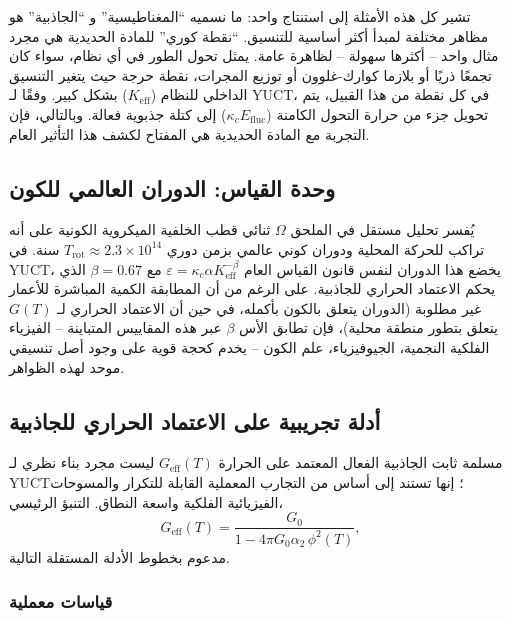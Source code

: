\documentclass[11pt,a4paper]{article}
\begin{document}
	تشير كل هذه الأمثلة إلى استنتاج واحد: ما نسميه ``المغناطيسية'' و ``الجاذبية'' هو مظاهر مختلفة لمبدأ أكثر أساسية للتنسيق. ``نقطة كوري'' للمادة الحديدية هي مجرد مثال واحد – أكثرها سهولة – لظاهرة عامة. يمثل تحول الطور في أي نظام، سواء كان تجمعًا ذريًا أو بلازما كوارك-غلوون أو توزيع المجرات، نقطة حرجة حيث يتغير التنسيق الداخلي للنظام ($K_{\mathrm{eff}}$) بشكل كبير. وفقًا لـ YUCT، في كل نقطة من هذا القبيل، يتم تحويل جزء من حرارة التحول الكامنة ($\kappa_c E_{\mathrm{fluc}}$) إلى كتلة جذبوية فعالة. وبالتالي، فإن التجربة مع المادة الحديدية هي المفتاح لكشف هذا التأثير العام.
	
	\subsection{وحدة القياس: الدوران العالمي للكون}
	
	يُفسر تحليل مستقل في الملحق $\Omega$ ثنائي قطب الخلفية الميكروية الكونية على أنه تراكب للحركة المحلية ودوران كوني عالمي بزمن دوري $T_{\mathrm{rot}} \approx 2.3\times10^{14}$ سنة. في YUCT، يخضع هذا الدوران لنفس قانون القياس العام $\varepsilon = \kappa_c \alpha K_{\mathrm{eff}}^{-\beta}$ مع $\beta = 0.67$ الذي يحكم الاعتماد الحراري للجاذبية. على الرغم من أن المطابقة الكمية المباشرة للأعمار غير مطلوبة (الدوران يتعلق بالكون بأكمله، في حين أن الاعتماد الحراري لـ $G(T)$ يتعلق بتطور منطقة محلية)، فإن تطابق الأس $\beta$ عبر هذه المقاييس المتباينة – الفيزياء الفلكية النجمية، الجيوفيزياء، علم الكون – يخدم كحجة قوية على وجود أصل تنسيقي موحد لهذه الظواهر.
	
	\subsection{أدلة تجريبية على الاعتماد الحراري للجاذبية}
	\label{sec:empirical}
	
	مسلمة ثابت الجاذبية الفعال المعتمد على الحرارة $G_{\mathrm{eff}}(T)$ ليست مجرد بناء نظري لـ YUCT؛ إنها تستند إلى أساس من التجارب المعملية القابلة للتكرار والمسوحات الفيزيائية الفلكية واسعة النطاق. التنبؤ الرئيسي،
	\begin{equation}
		G_{\mathrm{eff}}(T) = \frac{G_0}{1 - 4\pi G_0\alpha_2\,\phi^2(T)},
	\end{equation}
	مدعوم بخطوط الأدلة المستقلة التالية.
	
	\subsubsection*{قياسات معملية}
	
\end{document}
